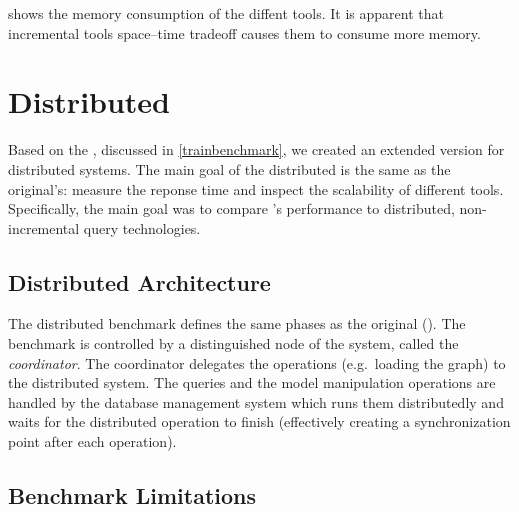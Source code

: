  shows the memory consumption of the diffent tools. It is apparent that incremental tools space--time tradeoff causes them to consume more memory.




\section{Distributed \tb{}}
\label{distributed-trainbenchmark}


Based on the \tb{}, discussed in \autoref{trainbenchmark}, we created an extended version for distributed systems. The main goal of the distributed \tb{} is the same as the original's: measure the reponse time and inspect the scalability of different tools. Specifically, the main goal was to compare \iqd{}'s performance to distributed, non-incremental query technologies.

\subsection{Distributed Architecture}

The distributed benchmark defines the same phases as the original \tb{} (). The benchmark is controlled by a distinguished node of the system, called the \emph{coordinator}. The coordinator delegates the operations (e.g.\ loading the graph) to the distributed system. The queries and the model manipulation operations are handled by the database management system which runs them distributedly and waits for the distributed operation to finish (effectively creating a synchronization point after each operation). 

\subsection{Benchmark Limitations}

